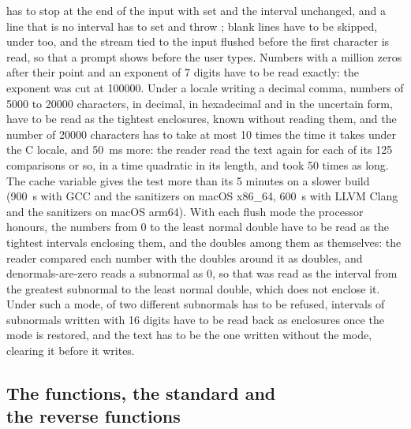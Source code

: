 \medskip
{} has to stop at the end of the input with
 set and the interval unchanged, and a line that is no
interval has to set  and throw ;
blank lines have to be skipped, under  too, and the
stream tied to the input flushed before the first character is read, so that
a prompt shows before the user types.\newinvfive{} Numbers with a million
zeros after their point and an exponent of 7 digits have to be read exactly:
the exponent was cut at 100000. Under a locale writing a decimal comma,
numbers of 5000 to 20000 characters, in decimal, in hexadecimal and in the
uncertain form, have to be read as the tightest enclosures, known without
reading them, and the number of 20000 characters has to take at most 10
times the time it takes under the C locale, and 50~ms more: the reader read
the text again for each of its 125 comparisons or so, in a time quadratic
in its length, and took 50 times as long.\newinvfive{} The cache variable
 gives the test more than its 5 minutes on a
slower build (900~s with GCC and the sanitizers on macOS x86\_64, 600~s
with LLVM Clang and the sanitizers on macOS arm64). With
each flush mode the processor honours, the numbers from 0 to the least
normal double have to be read as the tightest intervals enclosing them, and
the doubles among them as themselves: the reader compared each number with
the doubles around it as doubles, and denormals-are-zero reads a subnormal
as 0, so that  was read as the interval from the greatest
subnormal to the least normal double, which does not enclose
it.\newinvfive{} Under such a mode,  of two different
subnormals has to be refused, intervals of subnormals written with 16
digits have to be read back as enclosures once the mode is restored, and
the text has to be the one written without the mode, 
clearing it before it writes.\newinvfive

\subsection[The functions, the standard and the reverse functions]{The functions, the standard and\\ the reverse functions}

